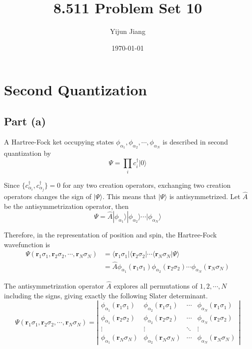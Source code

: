 \documentclass{article}
\title{8.511 Problem Set 10}
\author{Yijun Jiang}
\date{\today}
\begin{document}
\maketitle
\section{Second Quantization}
\subsection{Part (a)}
A Hartree-Fock ket occupying states $\phi_{\alpha_1},\phi_{\alpha_2},\cdots,\phi_{\alpha_N}$ is described in second quantization by
\begin{equation*}
\Psi=\prod_ic_i^\dag|0\rangle
\end{equation*}

Since $\{c_{\alpha_i}^\dag,c_{\alpha_j}^\dag\}=0$ for any two creation operators, exchanging two creation operators changes the sign of $|\Psi\rangle$. This means that $|\Psi\rangle$ is antisymmetrized. Let $\hat{A}$ be the antisymmetrization operator, then
\begin{equation*}
\Psi=\hat{A}|\phi_{\alpha_1}\rangle|\phi_{\alpha_2}\rangle\cdots|\phi_{\alpha_N}\rangle
\end{equation*}

Therefore, in the representation of position and spin, the Hartree-Fock wavefunction is
\begin{align*}
\Psi(\mathbf{r}_1\sigma_1,\mathbf{r}_2\sigma_2,\cdots,\mathbf{r}_N\sigma_N)&=\langle\mathbf{r}_1\sigma_1|\langle\mathbf{r}_2\sigma_2|\cdots\langle\mathbf{r}_N\sigma_N|\Psi\rangle\\
&=\hat{A}\phi_{\alpha_1}(\mathbf{r}_1\sigma_1)\phi_{\alpha_2}(\mathbf{r}_2\sigma_2)\cdots\phi_{\alpha_N}(\mathbf{r}_N\sigma_N)
\end{align*}

The antisymmetrization operator $\hat{A}$ explores all permutations of $1,2,\cdots,N$ including the signs, giving exactly the following Slater determinant.
\begin{equation*}
\Psi(\mathbf{r}_1\sigma_1,\mathbf{r}_2\sigma_2,\cdots,\mathbf{r}_N\sigma_N)=\left|\begin{array}{cccc}\phi_{\alpha_1}(\mathbf{r}_1\sigma_1)&\phi_{\alpha_2}(\mathbf{r}_1\sigma_1)&\cdots&\phi_{\alpha_N}(\mathbf{r}_1\sigma_1)\\ \phi_{\alpha_1}(\mathbf{r}_2\sigma_2)&\phi_{\alpha_2}(\mathbf{r}_2\sigma_2)&\cdots&\phi_{\alpha_N}(\mathbf{r}_2\sigma_2)\\ \vdots&\vdots&\ddots&\vdots\\ \phi_{\alpha_1}(\mathbf{r}_N\sigma_N)&\phi_{\alpha_2}(\mathbf{r}_N\sigma_N)&\cdots&\phi_{\alpha_N}(\mathbf{r}_N\sigma_N)\end{array}\right|
\end{equation*}
\end{document}
